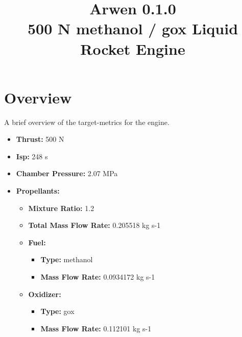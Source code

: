\documentclass[12pt]{report}
\title{Arwen 0.1.0  \\ 500 N methanol / gox Liquid Rocket Engine }
\begin{document}
\maketitle

\tableofcontents

\newpage





\newpage

\section{Overview}

A brief overview of the target-metrics for the engine.





\vspace{10 mm}

\begin{itemize}
	\item \large{\textbf{Thrust: }} 500 N 
	\item \large{\textbf{Isp: }} 248 s 
	\item \large{\textbf{Chamber Pressure: }} 2.07 MPa 
	\item \large{\textbf{Propellants: }}
	\begin{itemize}
		\item \large{\textbf{Mixture Ratio: }} 1.2 
		\item \large{\textbf{Total Mass Flow Rate: }} 0.205518 kg s-1 
		\item \large{\textbf{Fuel: }}
		\begin{itemize}
			\item \large{\textbf{Type: }} methanol 
			\item \large{\textbf{Mass Flow Rate: }} 0.0934172 kg s-1 
		\end{itemize}
		\item \large{\textbf{Oxidizer: }}
		\begin{itemize}
			\item \large{\textbf{Type: }} gox 
			\item \large{\textbf{Mass Flow Rate: }} 0.112101 kg s-1 
		\end{itemize}
	\end{itemize}
\end{itemize}






\newpage
\end{document}
